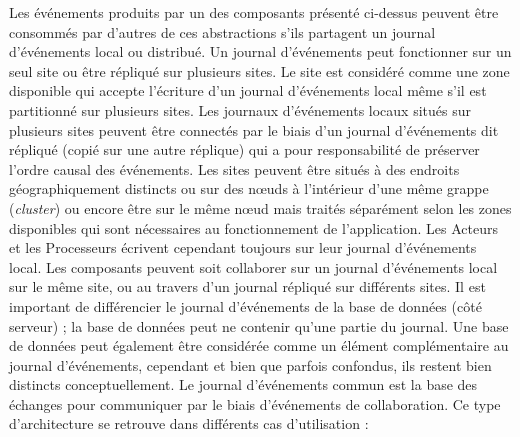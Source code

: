 Les événements produits par un des composants présenté ci-dessus
peuvent être consommés par d'autres de ces abstractions s'ils partagent un 
journal d'événements local ou distribué. Un journal d'événements peut 
fonctionner sur un seul site ou être répliqué 
sur plusieurs sites. 
Le site est considéré comme une zone disponible qui accepte 
l'écriture d'un journal d'événements local même s'il est partitionné sur plusieurs 
sites. Les journaux d'événements locaux situés sur plusieurs sites peuvent être 
connectés par le biais d'un journal d'événements dit \og répliqué\fg{} (copié sur une 
autre réplique) qui a pour responsabilité de préserver l'ordre causal des 
événements.
Les sites peuvent être situés à des endroits géographiquement distincts ou sur 
des nœuds à l'intérieur d'une même grappe (\textit{cluster}) ou encore être sur le 
même nœud mais traités séparément selon les zones 
disponibles qui sont nécessaires au fonctionnement de l'application. 
Les Acteurs et les Processeurs écrivent cependant toujours sur leur journal 
d'événements local. 
Les composants peuvent soit collaborer sur un journal d'événements local sur le 
même site, ou au travers d'un journal répliqué sur différents sites.
Il est important de différencier le journal d'événements de la base de données 
(côté serveur) ; la base de données peut ne contenir qu'une partie du journal. 
Une base de données peut également être considérée comme un élément 
complémentaire au journal d'événements, cependant et bien que parfois 
confondus, ils restent bien distincts conceptuellement.
Le journal d'événements commun est la base des échanges pour communiquer 
par le biais d'événements de collaboration. Ce type d'architecture se retrouve dans 
différents cas d'utilisation :
